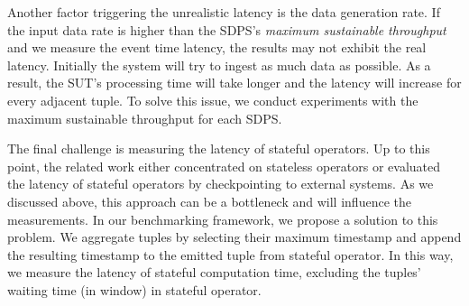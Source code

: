 Another factor triggering the unrealistic latency is the data generation rate. If the input data rate is higher than the SDPS's \textit{maximum sustainable throughput} and we measure the event time latency, the results may not exhibit the real  latency. 
Initially the system will try to ingest as much data as possible. As a result, the SUT's processing time will take longer and the latency will increase for every adjacent tuple. To solve this issue, we conduct experiments with the maximum sustainable throughput for each SDPS. 


 The final challenge is measuring the latency of stateful operators. Up to this point, the related work either concentrated on stateless operators or evaluated the latency of stateful operators by checkpointing to external systems. As we discussed above, this approach can be a bottleneck and will influence the measurements. In our benchmarking framework, we propose a solution to this problem.  
We aggregate tuples by selecting their maximum timestamp and append the resulting timestamp to the emitted tuple from stateful operator. 
 In this way, we measure the latency of stateful computation time, excluding the tuples' waiting time (in window) in stateful operator. 


